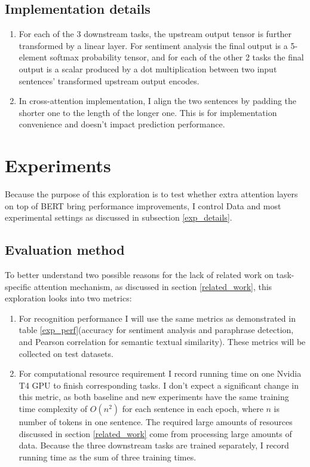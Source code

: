 \documentclass{article}
\begin{document}
\subsection{Implementation details}
\label{impl_details}
\begin{enumerate}
    \item For each of the 3 downstream tasks, the upstream output tensor is further transformed by a linear layer. For sentiment analysis the final output is a 5-element softmax probability tensor, and for each of the other 2 tasks the final output is a scalar produced by a dot multiplication between two input sentences' transformed upstream output encodes.
    \item In cross-attention implementation, I align the two sentences by padding the shorter one to the length of the longer one. This is for implementation convenience and doesn't impact prediction performance.
\end{enumerate}



\section{Experiments}
\label{exp}

Because the purpose of this exploration is to test whether extra attention layers on top of BERT bring performance improvements, I control Data and most experimental settings as discussed in subsection \ref{exp_details}.



\subsection{Evaluation method}
\label{metrics}
To better understand two possible reasons for the lack of related work on task-specific attention mechanism, as discussed in section \ref{related_work}, this exploration looks into two metrics:
\begin{enumerate}
    \item For recognition performance I will use the same metrics as demonstrated in table \ref{exp_perf}(accuracy for sentiment analysis and paraphrase detection, and Pearson correlation for semantic textual similarity). These metrics will be collected on test datasets.
    \item For computational resource requirement I record running time on one Nvidia T4 GPU to finish corresponding tasks. I don't expect a significant change in this metric, as both baseline and new experiments have the same training time complexity of $O(n^2)$ for each sentence in each epoch, where $n$ is number of tokens in one sentence. The required large amounts of resources discussed in section \ref{related_work} come from processing large amounts of data. Because the three downstream tasks are trained separately, I record running time as the sum of three training times.
    
\end{enumerate}
\end{document}
